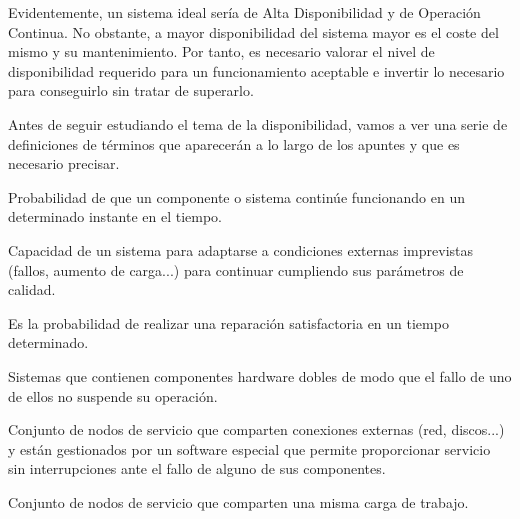 Evidentemente, un sistema ideal sería de Alta Disponibilidad y de Operación Continua. No obstante, a mayor disponibilidad del sistema mayor es el coste del mismo y su mantenimiento. Por tanto, es necesario valorar el nivel de disponibilidad requerido para un funcionamiento aceptable e invertir lo necesario para conseguirlo sin tratar de superarlo.

Antes de seguir estudiando el tema de la disponibilidad, vamos a ver una serie de definiciones de términos que aparecerán a lo largo de los apuntes y que es necesario precisar.

\begin{defn}
Probabilidad de que un componente o sistema continúe funcionando en un determinado instante en el tiempo.
\end{defn}

\begin{defn}
Capacidad de un sistema para adaptarse a
condiciones externas imprevistas (fallos, aumento de carga...) para continuar cumpliendo sus parámetros de calidad.
\end{defn}

\begin{defn}
Es la probabilidad de realizar una reparación satisfactoria en un tiempo determinado.
\end{defn}

\begin{defn}
Sistemas que contienen
componentes hardware dobles de modo que el fallo de uno de ellos no suspende su
operación.
\end{defn}
\newpage
\begin{defn}
Conjunto de nodos de servicio que comparten conexiones externas (red, discos...) y están gestionados por un software especial que permite proporcionar servicio sin interrupciones ante el fallo de alguno de sus componentes.
\end{defn}

\begin{defn}
Conjunto de nodos de servicio que comparten una misma carga de trabajo.
\end{defn}

